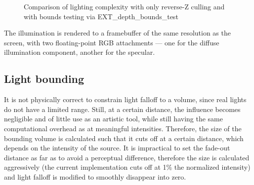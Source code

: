 
\begin{figure}[ht!]
  \centering
  \caption[Light volume culling comparison]{Comparison of lighting complexity with only reverse-Z culling and with bounds testing via EXT\_depth\_bounds\_test}
  \label{fig:lightingComplexityComparison}
\end{figure}

The illumination is rendered to a framebuffer of the same resolution as the screen, with two floating-point RGB attachments --- one for the diffuse illumination component, another for the specular.

\subsection{Light bounding}

It is not physically correct to constrain light falloff to a volume, since real lights do not have a limited range. Still, at a certain distance, the influence becomes negligible and of little use as an artistic tool, while still having the same computational overhead as at meaningful intensities. Therefore, the size of the bounding volume is calculated such that it cuts off at a certain distance, which depends on the intensity of the source. It is impractical to set the fade-out distance as far as to avoid a perceptual difference, therefore the size is calculated aggressively (the current implementation cuts off at 1\% the normalized intensity) and light falloff is modified to smoothly disappear into zero.

